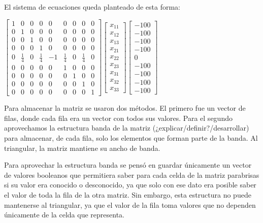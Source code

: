 \documentclass[spanish,a4paper]{article}
\begin{document}
El sistema de ecuaciones queda planteado de esta forma: \newline \newline

$\begin{bmatrix}1&0&0&0&0&0&0&0&0\\0&1&0&0&0&0&0&0&0\\0&0&1&0&0&0&0&0&0\\0&0&0&1&0&0&0&0&0\\0&\frac{1}{4}&0&\frac{1}{4}&-1&\frac{1}{4}&0&\frac{1}{4}&0\\0&0&0&0&0&1&0&0&0\\0&0&0&0&0&0&1&0&0\\0&0&0&0&0&0&0&1&0\\0&0&0&0&0&0&0&0&1\end{bmatrix} \begin{bmatrix}x_{11}\\x_{12}\\x_{13}\\x_{21}\\x_{22}\\x_{23}\\x_{31}\\x_{32}\\x_{33}\end{bmatrix} \begin{bmatrix}-100\\-100\\-100\\-100\\0\\-100\\-100\\-100\\-100\end{bmatrix}$ \newline \newline

Para almacenar la matriz se usaron dos métodos. El primero fue un vector de filas, donde cada fila era un vector con todos sus valores. Para el segundo aprovechamos la estructura banda de la matriz (¿explicar/definir?/desarrollar) para almacenar, de cada fila, solo los elementos que forman parte de la banda. Al triangular, la matriz mantiene su ancho de banda.

Para aprovechar la estructura banda se pensó en guardar únicamente un vector de valores booleanos que permitiera saber para cada celda de la matriz parabrisas si su valor era conocido o desconocido, ya que solo con ese dato era posible saber el valor de toda la fila de la otra matriz. Sin embargo, esta estructura no puede mantenerse al triangular, ya que el valor de la fila toma valores que no dependen únicamente de la celda que representa. 
\end{document}
